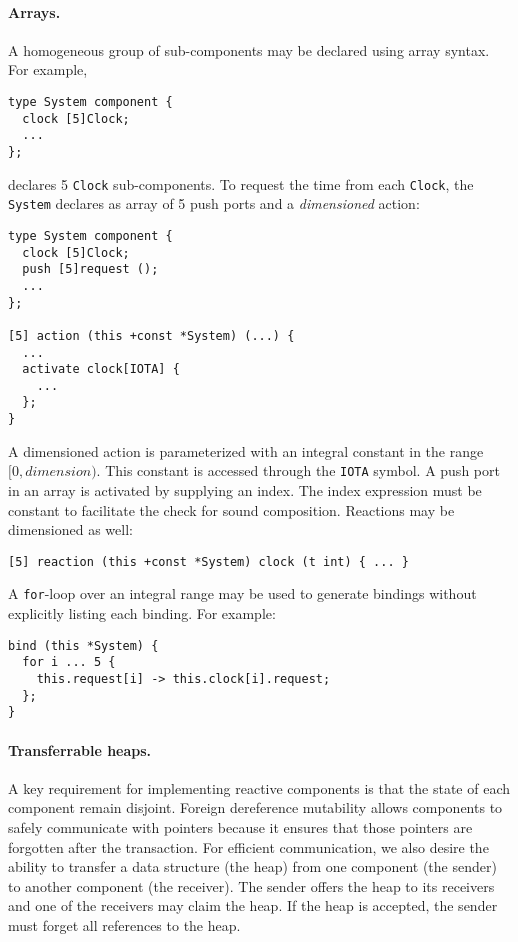 \paragraph{Arrays.}
A homogeneous group of sub-components may be declared using array syntax.
For example,
\begin{verbatim}
type System component {
  clock [5]Clock;
  ...
};
\end{verbatim}
declares 5 \verb+Clock+ sub-components.
To request the time from each \verb+Clock+, the \verb+System+ declares as array of 5 push ports and a \emph{dimensioned} action:
\begin{verbatim}
type System component {
  clock [5]Clock;
  push [5]request ();
  ...
};

[5] action (this +const *System) (...) {
  ...
  activate clock[IOTA] {
    ...
  };
}
\end{verbatim}
A dimensioned action is parameterized with an integral constant in the range $[0,dimension)$.
This constant is accessed through the \verb+IOTA+ symbol.
A push port in an array is activated by supplying an index.
The index expression must be constant to facilitate the check for sound composition.
Reactions may be dimensioned as well:
\begin{verbatim}
[5] reaction (this +const *System) clock (t int) { ... }
\end{verbatim}
A \verb+for+-loop over an integral range may be used to generate bindings without explicitly listing each binding.
For example:
\begin{verbatim}
bind (this *System) {
  for i ... 5 {
    this.request[i] -> this.clock[i].request;
  };
}
\end{verbatim}

\paragraph{Transferrable heaps.}
A key requirement for implementing reactive components is that the state of each component remain disjoint.
Foreign dereference mutability allows components to safely communicate with pointers because it ensures that those pointers are forgotten after the transaction.
For efficient communication, we also desire the ability to transfer a data structure (the heap) from one component (the sender) to another component (the receiver).
The sender offers the heap to its receivers and one of the receivers may claim the heap.
If the heap is accepted, the sender must forget all references to the heap.

